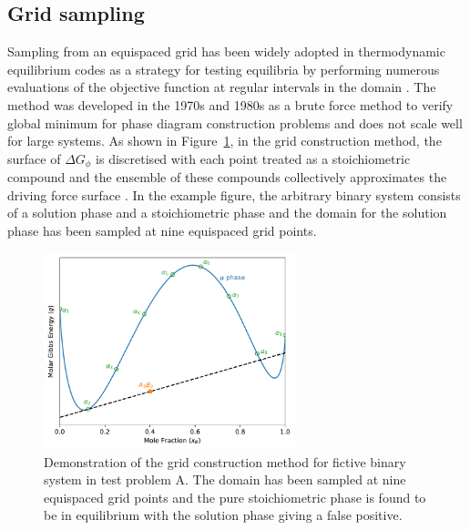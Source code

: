 \subsection{Grid sampling}
    Sampling from an equispaced grid has been widely adopted in thermodynamic equilibrium codes as a strategy for testing equilibria by performing numerous evaluations of the objective function at regular intervals in the domain \cite{Shobu09,Sundman85,Sundman15,Chen93a,Chen93b}. The method was developed in the 1970s and 1980s as a brute force method to verify global minimum for phase diagram construction problems and does not scale well for large systems. As shown in Figure~\ref{fig:Grid_cons}, in the grid construction method, the surface of $\Delta G_\phi$ is discretised with each point treated as a stoichiometric compound and the ensemble of these compounds collectively approximates the driving force surface \cite{Piro16}. In the example figure, the arbitrary binary system consists of a solution phase and a stoichiometric phase and the domain for the solution phase has been sampled at nine equispaced grid points.
\begin{figure}[htbp]
    \centering
    \includegraphics[width=0.65\textwidth]{figures/chapter-6/System_AB_grid.pdf}
    \caption{Demonstration of the grid construction method for fictive binary system in test problem A. The domain has been sampled at nine equispaced grid points and the pure stoichiometric phase  is found to be in equilibrium with the solution phase giving a false positive.}
    \label{fig:Grid_cons}
\end{figure}

